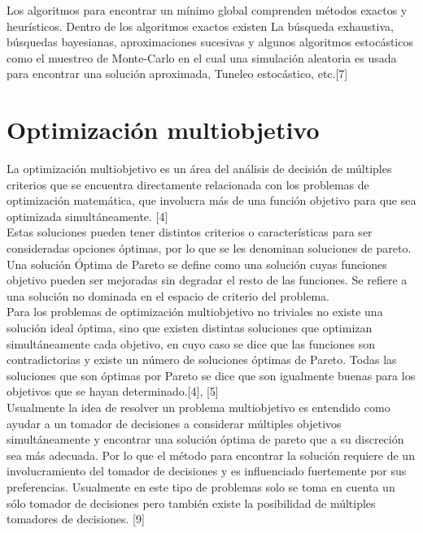 Los algoritmos para encontrar un mínimo global comprenden métodos exactos y heurísticos. Dentro de los algoritmos exactos existen La búsqueda exhaustiva, búsquedas bayesianas, aproximaciones sucesivas y algunos algoritmos estocásticos como el muestreo de Monte-Carlo en el cual una simulación aleatoria es usada para encontrar una solución aproximada, Tuneleo estocástico, etc.[7] \\

\section{Optimización multiobjetivo}

La optimización multiobjetivo es un área del análisis de decisión de múltiples criterios que se encuentra directamente relacionada con los problemas de optimización matemática, que involucra más de una función objetivo para que sea optimizada simultáneamente. [4] \\

Estas soluciones pueden tener distintos criterios o características para ser consideradas opciones óptimas, por lo que se les denominan soluciones de pareto. Una solución Óptima de Pareto se define como una solución cuyas funciones objetivo pueden ser mejoradas sin degradar el resto de las funciones. Se refiere a una solución no dominada en el espacio de criterio del problema. \\

Para los problemas de optimización multiobjetivo no triviales no existe una solución ideal óptima, sino que existen distintas soluciones que optimizan simultáneamente cada objetivo, en cuyo caso se dice que las funciones son contradictorias y existe un número de soluciones óptimas de Pareto. Todas las soluciones que son óptimas por Pareto se dice que son igualmente buenas para los objetivos que se hayan determinado.[4], [5] \\

Usualmente la idea de resolver un problema multiobjetivo es entendido como ayudar a un tomador de decisiones a considerar múltiples objetivos simultáneamente y encontrar una solución óptima de pareto que a su discreción sea más adecuada. Por lo que el método para encontrar la solución requiere de un involucramiento del tomador de decisiones y es influenciado fuertemente por sus preferencias. Usualmente en este tipo de problemas solo se toma en cuenta un sólo tomador de decisiones pero también existe la posibilidad de múltiples tomadores de decisiones. [9]

